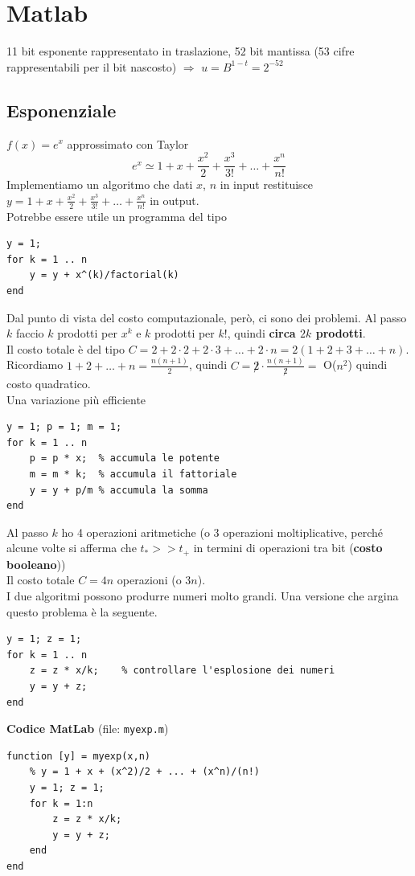\documentclass[10pt]{book}
\begin{document}
\chapter{Matlab}
11 bit esponente rappresentato in traslazione, 52 bit mantissa (53 cifre rappresentabili per il bit nascosto) $\Rightarrow$ $u = B^{1-t} = 2^{-52}$
\section{Esponenziale}
$f(x) = e^x$ approssimato con Taylor $$e^x \simeq 1 + x + \frac{x^2}{2} + \frac{x^3}{3!} + \ldots + \frac{x^n}{n!}$$ Implementiamo un algoritmo che dati $x$, $n$ in input restituisce $y = 1 + x + \frac{x^2}{2} + \frac{x^3}{3!} + \ldots + \frac{x^n}{n!}$ in output.\\
Potrebbe essere utile un programma del tipo
\begin{lstlisting}
y = 1;
for k = 1 .. n
	y = y + x^(k)/factorial(k)
end
\end{lstlisting}
Dal punto di vista del costo computazionale, però, ci sono dei problemi. Al passo $k$ faccio $k$ prodotti per $x^k$ e $k$ prodotti per $k!$, quindi \textbf{circa $2k$ prodotti}.\\
Il costo totale è del tipo $C = 2 + 2\cdot 2 + 2\cdot 3 + \ldots + 2\cdot n = 2(1 + 2 + 3 + \ldots + n)$.\\
Ricordiamo $1 + 2 + \ldots + n = \frac{n(n + 1)}{2}$, quindi $C = \not 2\cdot\frac{n(n+1)}{\not 2} =$ O($n^2$) quindi costo quadratico.\\
Una variazione più efficiente
\begin{lstlisting}
y = 1; p = 1; m = 1;
for k = 1 .. n
	p = p * x;	% accumula le potente
	m = m * k;	% accumula il fattoriale
	y = y + p/m	% accumula la somma
end
\end{lstlisting}
Al passo $k$ ho 4 operazioni aritmetiche (o 3 operazioni moltiplicative, perché alcune volte si afferma che $t_* >> t_+$ in termini di operazioni tra bit (\textbf{costo booleano}))\\
Il costo totale $C = 4n$ operazioni (o $3n$).\\
I due algoritmi possono produrre numeri molto grandi. Una versione che argina questo problema è la seguente.
\begin{lstlisting}
y = 1; z = 1;
for k = 1 .. n
	z = z * x/k;	% controllare l'esplosione dei numeri
	y = y + z;
end
\end{lstlisting}
\begin{center}
\pagebreak
\textbf{Codice MatLab} (file: \texttt{myexp.m})
\begin{lstlisting}
function [y] = myexp(x,n)
    % y = 1 + x + (x^2)/2 + ... + (x^n)/(n!)
    y = 1; z = 1;
    for k = 1:n
        z = z * x/k;
        y = y + z;
    end
end
\end{lstlisting}
\end{center}
\end{document}
